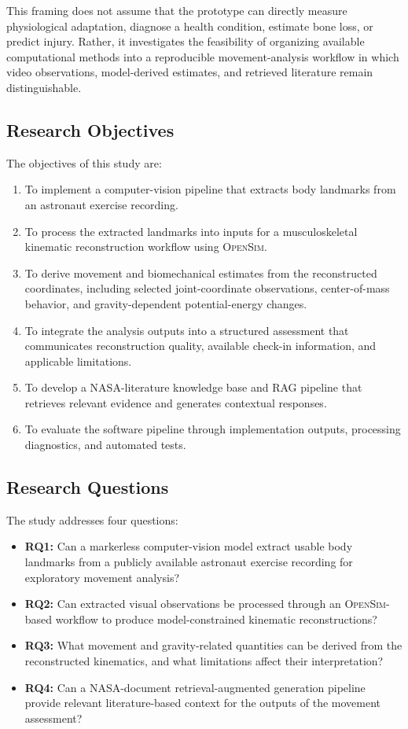 \documentclass[11pt,a4paper]{article}
\newcommand{\OpenSim}{\textsc{OpenSim}}
\begin{document}
This framing does not assume that the prototype can directly measure physiological adaptation, diagnose a health condition, estimate bone loss, or predict injury. Rather, it investigates the feasibility of organizing available computational methods into a reproducible movement-analysis workflow in which video observations, model-derived estimates, and retrieved literature remain distinguishable.

\subsection{Research Objectives}

The objectives of this study are:
\begin{enumerate}[label=\arabic*.]
  \item To implement a computer-vision pipeline that extracts body landmarks from an astronaut exercise recording.
  \item To process the extracted landmarks into inputs for a musculoskeletal kinematic reconstruction workflow using \OpenSim.
  \item To derive movement and biomechanical estimates from the reconstructed coordinates, including selected joint-coordinate observations, center-of-mass behavior, and gravity-dependent potential-energy changes.
  \item To integrate the analysis outputs into a structured assessment that communicates reconstruction quality, available check-in information, and applicable limitations.
  \item To develop a NASA-literature knowledge base and RAG pipeline that retrieves relevant evidence and generates contextual responses.
  \item To evaluate the software pipeline through implementation outputs, processing diagnostics, and automated tests.
\end{enumerate}

\subsection{Research Questions}

The study addresses four questions:
\begin{itemize}
  \item \textbf{RQ1:} Can a markerless computer-vision model extract usable body landmarks from a publicly available astronaut exercise recording for exploratory movement analysis?
  \item \textbf{RQ2:} Can extracted visual observations be processed through an \OpenSim-based workflow to produce model-constrained kinematic reconstructions?
  \item \textbf{RQ3:} What movement and gravity-related quantities can be derived from the reconstructed kinematics, and what limitations affect their interpretation?
  \item \textbf{RQ4:} Can a NASA-document retrieval-augmented generation pipeline provide relevant literature-based context for the outputs of the movement assessment?
\end{itemize}
\end{document}

